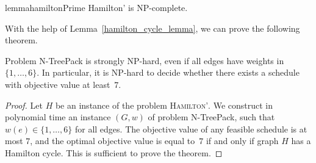 \documentclass[runningheads]{llncs}
\newcommand{\set}[1]{\{ #1 \}}
\newcommand{\fromto}[2]{\set{#1, \ldots, #2}}
\newcommand{\xxxNTP}{{\sc N-TreePack}}
\begin{document}
\begin{restatable}{lemma}{hamiltonPrime}
\label{hamilton_cycle_lemma}
\mbox{\sc Hamilton'} is NP-complete.
\end{restatable} 

With the help of Lemma~\ref{hamilton_cycle_lemma}, we can prove the following theorem.
\begin{theorem}
\label{th:small-weights}
Problem {\xxxNTP} is strongly NP-hard, even if all edges have weights in $\fromto{1}{6}$.
In particular, it is NP-hard to decide whether there exists a schedule with objective value at least~$7$.
\end{theorem}
\begin{proof}
Let $H$ be an instance of the problem \textsc{Hamilton'}. 
We construct in polynomial time an instance $(G,w)$ of problem {\xxxNTP}, such that $w(e)\in\fromto{1}{6}$ 
for all edges. 
The objective value of any feasible schedule is at most $7$, and the optimal objective value is equal to~$7$ 
if and only if graph $H$ has a Hamilton cycle. This is sufficient to prove the theorem.


\end{proof}
\end{document}
